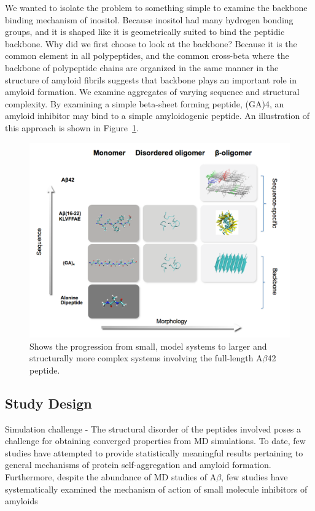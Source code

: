 We wanted to isolate the problem to something simple to examine the backbone binding mechanism of inositol.  Because inositol had many hydrogen bonding groups, and it is shaped like it is geometrically suited to bind the peptidic backbone. Why did we first choose to look at the backbone?  Because it is the common element in all polypeptides, and the common cross-beta where the backbone of polypeptide chains are organized in the same manner in the structure of amyloid fibrils suggests that backbone plays an important role in amyloid formation.  We examine aggregates of varying sequence and  structural complexity.  By examining a simple beta-sheet forming peptide, (GA)4,  an amyloid inhibitor may bind to a simple amyloidogenic peptide. An illustration of this approach is shown in Figure~\ref{fig:rationale}.

\begin{figure}
  \centering
  \includegraphics[width=6in]{figures/introduction/matrix.pdf}
  \caption[Rationale]{Shows the progression from small, model systems to larger and structurally more complex systems involving the full-length A$\beta$42 peptide.}
  \label{fig:rationale}
\end{figure}

\subsection{Study Design}

Simulation challenge - The structural disorder of the peptides involved poses a challenge for obtaining converged properties from MD simulations.  To date, few studies have attempted to provide statistically meaningful results pertaining to general mechanisms of protein self-aggregation and amyloid formation. Furthermore, despite the abundance of MD studies of A$\beta$, few studies have systematically examined the mechanism of action of small molecule inhibitors of amyloids

